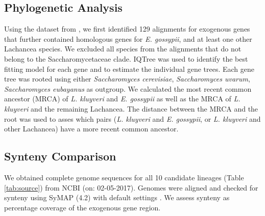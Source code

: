 \documentclass[doublespacing,linenumbers]{bmcart}
\newcommand{\kluyveri}{\textit{L. kluyveri}\xspace}
\newcommand{\gossypii}{\textit{E. gossypii}\xspace}
\begin{document}
\subsection*{Phylogenetic Analysis}
Using the dataset from \cite{shen2018}, we first identified 129 alignments for exogenous genes that further contained homologous genes for \gossypii, and at least one other Lachancea species.
We excluded all species from the alignments that do not belong to the Saccharomycetaceae clade. 
IQTree \citep{nguyen2015} was used to identify the best fitting model for each gene and to estimate the individual gene trees.
Each gene tree was rooted using either \textit{Saccharomyces cerevisiae}, \textit{Saccharomyces uvarum}, \textit{Saccharomyces eubayanus} as outgroup.
We calculated the most recent common ancestor (MRCA) of \kluyveri and \gossypii as well as the MRCA of \kluyveri and the remaining Lachancea.
The distance between the MRCA and the root was used to asses which pairs (\kluyveri and \gossypii, or \kluyveri and other Lachancea) have a more recent common ancestor.

\subsection*{Synteny Comparison}
We obtained complete genome sequences for all 10 candidate lineages (Table \ref{tab:source}) from NCBI (on: 02-05-2017).
Genomes were aligned and checked for synteny using SyMAP (4.2) with default settings \citep{soderlund2006, soderlund2011}.
We assess synteny as percentage coverage of the exogenous gene region.
\end{document}

